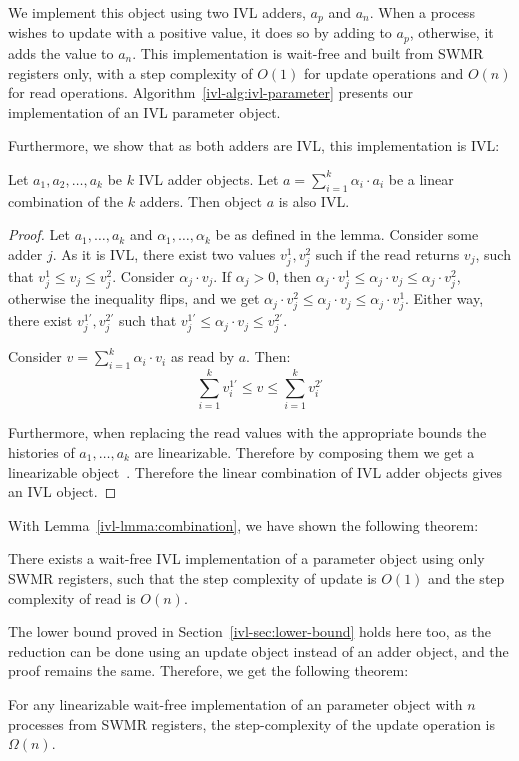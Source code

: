 We implement this object using two IVL adders, $a_p$ and $a_n$. When a process wishes to
update with a positive value, it does so by adding to $a_p$, otherwise, it adds the value to $a_n$.
This implementation is wait-free and built from SWMR registers only,
with a step complexity of $O(1)$ for {\sc update} operations and $O(n)$
for {\sc read} operations. Algorithm~\ref{ivl-alg:ivl-parameter} presents our implementation of an IVL parameter object.


Furthermore, we show that as both adders are IVL, this implementation is IVL:
\begin{lemma}
    Let $a_1,a_2,\dots, a_k$ be $k$ IVL adder objects. Let $a=\sum_{i=1}^k \alpha_i \cdot a_i$ be a linear
    combination of the $k$ adders. Then object $a$ is also IVL.
    \label{ivl-lmma:combination}
\end{lemma}
\begin{proof}
    Let $a_1, \dots, a_k$ and $\alpha_1, \dots, \alpha_k$ be as defined in the lemma.
    Consider some adder $j$. As it is IVL, there exist two values $v_j^1, v_j^2$ such if
    the read returns $v_j$, such that $v_j^1 \leq v_j \leq v_j^2$. Consider $\alpha_j \cdot v_j$.
    If $\alpha_j > 0$, then $\alpha_j \cdot v_j^1 \leq \alpha_j \cdot  v_j \leq \alpha_j \cdot v_j^2$,
    otherwise the inequality flips, and we get $\alpha_j \cdot v_j^2 \leq \alpha_j \cdot  v_j \leq \alpha_j \cdot v_j^1$.
    Either way, there exist $v_j^{1'}, v_j^{2'}$ such that $v_j^{1'} \leq \alpha_j \cdot  v_j \leq v_j^{2'}$.

    Consider $v = \sum_{i=1}^k \alpha_i \cdot v_i$ as read by $a$. Then:
    \begin{equation}
        \sum_{i=1}^k v_i^{1'} \leq v \leq \sum_{i=1}^k v_i^{2'}
    \end{equation}

    Furthermore, when replacing the read values with the appropriate bounds the histories of $a_1, \dots, a_k$ are linearizable.
    Therefore by composing them we get a linearizable object~\cite{herlihy1990linearizability}. Therefore the linear
    combination of IVL adder objects gives an IVL object.
\end{proof}

With Lemma~\ref{ivl-lmma:combination}, we have shown the following theorem:
\begin{theorem}
    There exists a wait-free IVL implementation of a parameter object using only SWMR registers,
    such that the step complexity of {\sc update} is $O(1)$
    and the step complexity of {\sc read} is $O(n)$.
\end{theorem}

The lower bound proved in Section~\ref{ivl-sec:lower-bound} holds here too, as the reduction can be
done using an update object instead of an adder object, and the proof remains the same. Therefore,
we get the following theorem:
\begin{theorem}
    For any linearizable wait-free implementation of an parameter object with $n$ processes from SWMR registers, the step-complexity
    of the {\sc update} operation is $\Omega(n)$.
    \label{ivl-thm:lower-bound}
\end{theorem}